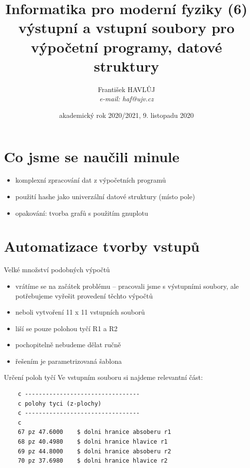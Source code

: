 \documentclass{beamer}
\title[IMF (6)]{Informatika pro moderní fyziky (6)\\výstupní a vstupní soubory pro výpočetní programy, datové struktury}
\author[Franti\v{s}ek HAVL\r{U}J, ORF ÚJV Řež]{Franti\v{s}ek HAVL\r{U}J\\{\scriptsize \emph{e-mail: haf@ujv.cz}}}
\date{akademický rok 2020/2021, 9. listopadu 2020}
\institute[ORF ÚJV Řež]
{ÚJV Řež\\oddělení Reaktorové fyziky a podpory palivového cyklu}
\begin{document}
\begin{frame}
  \titlepage
\end{frame}

\begin{frame}
  \tableofcontents
\end{frame}

\section{Co jsme se naučili minule}

\begin{frame}{}
  \begin{itemize}
    \item komplexní zpracování dat z výpočetních programů
    \item použití hashe jako univerzální datové struktury (místo pole)
    \item opakování: tvorba grafů s použitím gnuplotu
  \end{itemize}
\end{frame}

\section{Automatizace tvorby vstupů}

\begin{frame}[fragile]{Velké množství podobných výpočtů}
  \begin{itemize}
    \item vrátíme se na začátek problému – pracovali jsme s výstupními soubory, ale potřebujeme vyřešit provedení těchto výpočtů
    \item neboli vytvoření 11 x 11 vstupních souborů
    \item liší se pouze polohou tyčí R1 a R2
    \item pochopitelně nebudeme dělat ručně
    \item řešením je parametrizovaná šablona
  \end{itemize}
\end{frame}

\begin{frame}[fragile]{Určení poloh tyčí}
  Ve vstupním souboru si najdeme relevantní část:
  \scriptsize
  \begin{verbatim}
    c ---------------------------------
    c polohy tyci (z-plochy)
    c ---------------------------------
    c
    67 pz 47.6000    $ dolni hranice absoberu r1
    68 pz 40.4980    $ dolni hranice hlavice r1
    69 pz 44.8000    $ dolni hranice absoberu r2
    70 pz 37.6980    $ dolni hranice hlavice r2
  \end{verbatim}
\end{frame}
\end{document}

